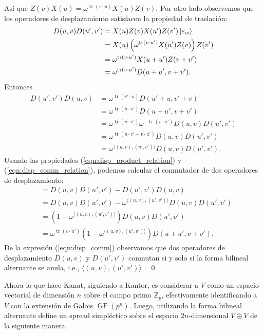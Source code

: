 \documentclass[a4paper]{report}
\DeclareMathOperator{\tr}{tr}
\DeclareMathOperator{\GF}{GF}
\begin{document}
  Así que $Z(v)X(u) = \omega^{\tr(v \cdot u)} X(u)Z(v)$. Por
  otro lado observemos que los operadores de desplazamiento
  satisfacen la propiedad de traslación:
  \begin{align}
    D(u,v) D(u',v')
    &= X(u)Z(v) X(u')Z(v') \ket{e_w} \\
    &= X(u) \left( \omega^{\tr(v \cdot u')} X(u') Z(v)
    \right) Z(v') \\
    &= \omega^{\tr(v \cdot u')} X(u+u') Z(v + v') \\
    &= \omega^{\tr(v \cdot u')} D(u+u',v+v')
    \label{eqn:disp_product_relation}.
  \end{align}
  Entonces
  \begin{align}
    D(u',v')D(u,v)
    &= \omega^{\tr(v' \cdot u)} D(u'+u,v'+v) \\
    &= \omega^{\tr(u \cdot v')} D(u+u',v+v') \\
    &= \omega^{\tr(u \cdot v')} \omega^{-\tr(v \cdot u')}
    D(u,v)D(u',v') \\
    &= \omega^{\tr(u \cdot v' - v \cdot u')} D(u,v)D(u',v')
    \\
    &= \omega^{\langle (u,v), (u',v') \rangle}
    D(u,v)D(u',v') \label{eqn:disp_comm_relation}.
  \end{align}
  Usando las propiedades (\ref{eqn:disp_product_relation}) y
  (\ref{eqn:disp_comm_relation}), podemos calcular el
  conmutador de dos operadores de desplazamiento: 
  \begin{align}
    [D(u,v),D(u',v')]
    &= D(u,v)D(u',v') - D(u',v')D(u,v) \\
    &= D(u,v)D(u',v') - \omega^{\langle (u,v),(u',v')
    \rangle} D(u,v) D(u',v') \\
    &= \left( 1 - \omega^{\langle (u,v),(u',v') \rangle}
    \right) D(u,v)D(u',v') \\
    &= \omega^{\tr(v \cdot u')} \left( 1 - \omega^{\langle
    (u,v),(u',v') \rangle} \right) D(u+u',v+v').
    \label{eqn:disp_comm}
  \end{align}
  De la expresión (\ref{eqn:disp_comm}) observamos que dos
  operadores de desplazamiento $D(u,v)$ y $D(u',v')$
  conmutan si y solo si la forma bilineal alternante se
  anula, i.e., $\langle (u,v), (u',v') \rangle = 0$.

  Ahora lo que hace Kanat, siguiendo a Kantor, es considerar
  a $V$ como un espacio vectorial de dimensión $n$ sobre el
  campo primo $\mathbb Z_p$, efectivamente identificando a
  $V$ con la extensión de Galois $\GF(p^{n})$. Luego,
  utilizando la forma bilineal alternante define un spread
  simpléctico sobre el espacio $2n$-dimensional $V \oplus
  V$ de la siguiente manera.
\end{document}

